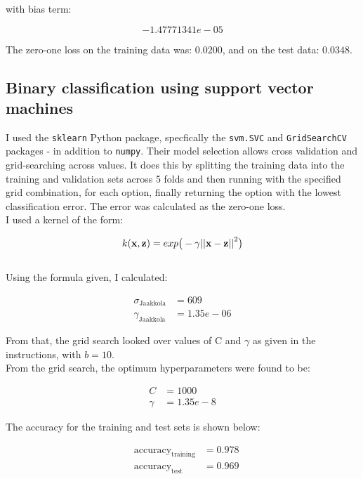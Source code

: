 \documentclass{scrartcl}
\begin{document}
with bias term:

\[ -1.47771341e-05 \]

The zero-one loss on the training data was: $0.0200$, and on the test data: $0.0348$.

\subsection{Binary classification using support vector machines}
I used the \texttt{sklearn} Python package, specfically the \texttt{svm.SVC} and \texttt{GridSearchCV} packages - in addition to \texttt{numpy}. Their model selection allows cross validation and grid-searching across values. It does this by splitting the training data into the training and validation sets across 5 folds and then running with the specified grid combination, for each option, finally returning the option with the lowest classification error. The error was calculated as the zero-one loss.\\

I used a kernel of the form:

\[ k({\mathbf x}, {\mathbf z}) = exp \big(-\gamma {|| {\mathbf x}- {\mathbf z}||}^2\big) \] \\

\newpage
Using the formula given, I calculated:

\begin{align*}
    \sigma_{\text{Jaakkola}} &= 609 \\
    \gamma_{\text{Jaakkola}} &= 1.35e-06
\end{align*}

From that, the grid search looked over values of C and $\gamma$ as given in the instructions, with $b = 10$. \\

From the grid search, the optimum hyperparameters were found to be:

\begin{align*}
    C &= 1000 \\
    \gamma &= 1.35e-8
\end{align*}

The accuracy for the training and test sets is shown below:

\begin{align*}
    & \text{accuracy}_{\text{training}}   &= 0.978 \\
    & \text{accuracy}_{\text{test}}       &= 0.969 \\
\end{align*}
\end{document}
